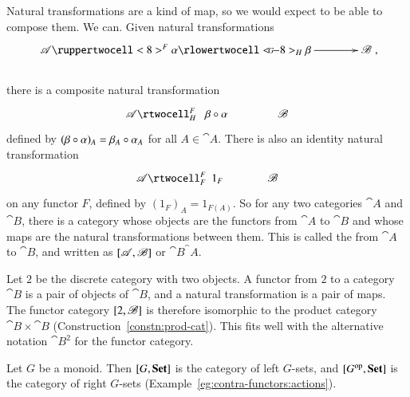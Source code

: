 \begin{constn}
\label{constn:comp-nat}
Natural transformations are a kind of map, so we would expect to be able to
compose%
%
%
them.  We can.  Given natural transformations
%
\vspace{-2ex}
\[
\xymatrix@C+1.5em{
\cat{A}
\ruppertwocell<8>^F{\alpha}
\ar[r]|G
\rlowertwocell<-8>_H{\beta}
&
\cat{B}
},
\]
\vspace{-3ex}\\
%
there is a composite natural transformation
\[
\xymatrix@C+1.5em{
\cat{A} \rtwocell^F_H{\hspace{.8em}\beta\of\alpha} &\cat{B}
}%
%
\ntn{of-nt}
%
\]
defined by $(\beta\mathbin{\circ}\alpha)_A = \beta_A \mathbin{\circ} \alpha_A$ for all $A \in
\cat{A}$.  There is also an identity%
%
%
natural transformation
\[
\xymatrix@C+1em{
\cat{A} \rtwocell^F_F{\hspace{.5em}1_F} &\cat{B}
}%
%
\ntn{id-nt}
%
\]
on any functor $F$, defined by $(1_F)_A = 1_{F(A)}$.  So for any two
categories $\cat{A}$ and $\cat{B}$, there is a category whose objects are
the functors from $\cat{A}$ to $\cat{B}$ and whose maps are the natural
transformations between them.  This is called the  from $\cat{A}$ to $\cat{B}$, and written as
$[\mathscr{A},\mathscr{B}]$%
%
%
 or
$\cat{B}^\cat{A}$.%
%
%
\end{constn}

\begin{example}
Let $2$%
%
%
be the discrete%
%
%
category with two objects.  A functor from $2$ to a category $\cat{B}$ is a
pair of objects of $\cat{B}$, and a natural transformation is a pair of
maps.  The functor category $[2,\mathscr{B}]$ is therefore isomorphic
to the product category $\cat{B} \times \cat{B}$
(Construction~\ref{constn:prod-cat}).  This fits well with the alternative
notation $\cat{B}^2$ for the functor category.
\end{example}

\begin{example}
Let $G$ be a monoid.%
%
%
Then $[G,\mathbf{Set}]$%
%
%
is the category of left $G$-sets, and $[G^{\mathrm{op}},\mathbf{Set}]$ is the
category of right $G$-sets (Example~\ref{eg:contra-functors:actions}).
\end{example}

